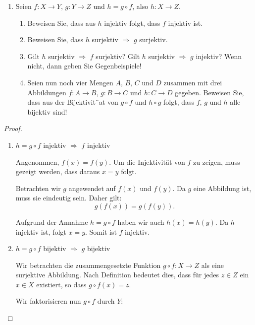 \documentclass{../problemset}
\begin{document}
\pagebreak

\begin{problem}
\begin{enumerate}
	\item Seien $f: X \to Y$, $g: Y \to Z$ und $h = g \circ f$, also $h: X \to Z$.
	      \begin{enumerate}
		      \item Beweisen Sie, dass aus $h$ injektiv folgt, dass $f$ injektiv ist.
		      \item Beweisen Sie, dass $h$ surjektiv $\Rightarrow$ $g$ surjektiv.
		      \item Gilt $h$ surjektiv $\Rightarrow$ $f$ surjektiv? Gilt $h$ surjektiv $\Rightarrow$ $g$ injektiv? Wenn nicht, dann geben Sie Gegenbeispiele!
		      \item Seien nun noch vier Mengen $A$, $B$, $C$ und $D$ zusammen mit drei Abbildungen $f: A \to B$, $g: B \to C$ und $h: C \to D$ gegeben. Beweisen Sie, dass aus der Bijektivit¨at von $g \circ f$ und $h \circ g$ folgt, dass $f$, $g$ und $h$ alle bijektiv sind!
	      \end{enumerate}

\end{enumerate}

\begin{proof} $ $
	\begin{enumerate}
		\item $h = g \circ f$ injektiv $\Rightarrow$ $f$ injektiv

		      Angenommen, $f(x) = f(y)$. Um die Injektivität von $f$ zu zeigen, muss gezeigt werden, dass daraus $x = y$ folgt.

		      Betrachten wir $g$ angewendet auf $f(x)$ und $f(y)$. Da $g$ eine Abbildung ist, muss sie eindeutig sein. Daher gilt:
		      \[
			      g(f(x)) = g(f(y)).
		      \]

		      Aufgrund der Annahme $h = g \circ f$ haben wir auch $h(x) = h(y)$.
		      Da $h$ injektiv ist, folgt $x = y$. Somit ist $f$ injektiv. \checkmark
		\item $h = g \circ f$ bijektiv $\Rightarrow$ $g$ bijektiv

		      Wir betrachten die zusammengesetzte Funktion \(g \circ f: X \to Z\) als eine surjektive Abbildung. Nach Definition bedeutet dies, dass für jedes \(z \in Z\) ein \(x \in X\) existiert, so dass \(g \circ f(x) = z\).

		      Wir faktorisieren nun \(g \circ f\) durch \(Y\):


\end{enumerate}
\end{proof}
\end{problem}
\end{document}
